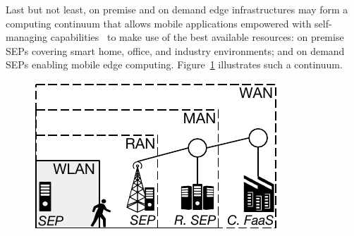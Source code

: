 Last but not least, on premise and on demand edge infrastructures may form a computing continuum that allows mobile applications empowered with self-managing capabilities~\cite{Baresi:2018} to make use of the best available resources: on premise SEPs covering smart home, office, and industry environments; and on demand SEPs enabling mobile edge computing. Figure~\ref{fig:Edge_Cloud_Continuum} illustrates such a continuum.

\begin{figure}[tbp]
	\centering
	\includegraphics[width=\linewidth]{Figs/Edge_Cloud_Continuum}
	\caption{}
	\label{fig:Edge_Cloud_Continuum}
\end{figure}



